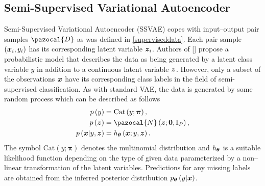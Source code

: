 \subsection{Semi-Supervised Variational Autoencoder}
Semi-Supervised Variational Autoencoder (SSVAE) copes with input--output pair samples $\pazocal{D}$ as was defined in \eqref{superviseddata}. Each pair sample $\left(\boldsymbol{x}_i, y_i\right)$ has its corresponding latent variable $\boldsymbol{z}_i$. Authors of [] propose a probabilistic model that describes the data as being generated by a latent class variable $y$ in addition to a continuous latent variable $\boldsymbol{z}$. However, only a subset of the observations $\boldsymbol{x}$ have its corresponding class labels in the field of semi-supervised classification. As with standard VAE, the data is generated by some random process which can be described as follows
\begin{align}
    p\left(y\right) &= \mathrm{Cat}\left(y; \boldsymbol{\pi}\right),\\
    p\left(\bz\right) &= \pazocal{N}\left(\bz; \boldsymbol{0}, \mathbb{I}_P\right),\\
    p\left(\bx\vert y, \bz \right) &= h_{\bt}\left(\bx; y ,\bz \right).
\end{align}
The symbol $\mathrm{Cat}\left(y; \boldsymbol{\pi}\right)$ denotes the multinomial distribution and $h_{\boldsymbol{\theta}}$ is a suitable likelihood function depending on the type of given data parameterized by a non--linear transformation of the latent variables. Predictions for any missing labels are obtained from the inferred posterior distribution $p_{\boldsymbol{\theta}}\left(y|\boldsymbol{x}\right)$.  


